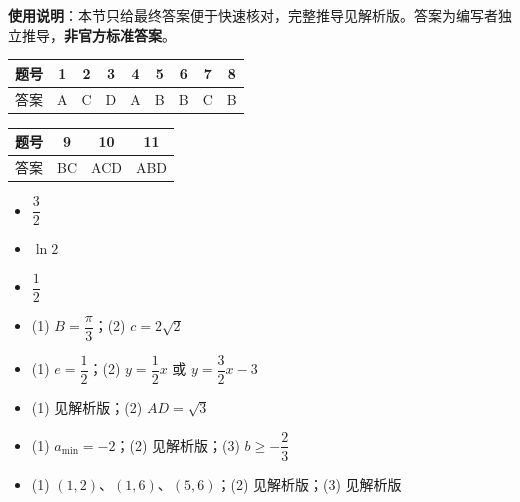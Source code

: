 
\begin{gknotice}
\textbf{使用说明}：本节只给最终答案便于快速核对，完整推导见解析版。答案为编写者独立推导，\textbf{非官方标准答案}。
\end{gknotice}

\begin{center}\begin{tabular}{ccccccccc}
\toprule
题号 & 1 & 2 & 3 & 4 & 5 & 6 & 7 & 8 \\
\midrule
答案 & A & C & D & A & B & B & C & B \\
\bottomrule
\end{tabular}\end{center}

\begin{center}\begin{tabular}{cccc}
\toprule
题号 & 9 & 10 & 11 \\
\midrule
答案 & BC & ACD & ABD \\
\bottomrule
\end{tabular}\end{center}

\begin{itemize}[leftmargin=2.6em]
  \item[\textbf{12.}] $\dfrac32$
  \item[\textbf{13.}] $\ln2$
  \item[\textbf{14.}] $\dfrac12$
\end{itemize}

\begin{itemize}[leftmargin=2.6em]
  \item[\textbf{15.}] (1) $B=\dfrac\pi3$；(2) $c=2\sqrt2$
  \item[\textbf{16.}] (1) $e=\dfrac12$；(2) $y=\dfrac12x$ 或 $y=\dfrac32x-3$
  \item[\textbf{17.}] (1) 见解析版；(2) $AD=\sqrt3$
  \item[\textbf{18.}] (1) $a_{\min}=-2$；(2) 见解析版；(3) $b\ge-\dfrac23$
  \item[\textbf{19.}] (1) $(1,2)$、$(1,6)$、$(5,6)$；(2) 见解析版；(3) 见解析版
\end{itemize}

